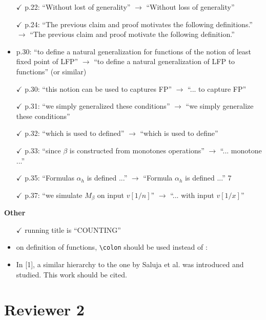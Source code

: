 \documentclass[a4paper]{article}
\begin{document}
\begin{itemize}
	\item[$\checkmark$] p.22: ``Without lost of generality'' $\to$ ``Without loss of generality''
	\item[$\checkmark$] p.24: ``The previous claim and proof motivates the following definitions.'' $\to$ ``The previous
	claim and proof motivate the following definition.''
	\item p.30: ``to define a natural generalization for functions of the notion of least fixed point of
	LFP'' $\to$ ``to define a natural generalization of LFP to functions'' (or similar)
	\item[$\checkmark$] p.30: ``this notion can be used to captures FP'' $\to$ ``... to capture FP''
	\item[$\checkmark$] p.31: ``we simply generalized these conditions'' $\to$ ``we simply generalize these conditions''
	\item[$\checkmark$] p.32: ``which is used to defined'' $\to$ ``which is used to define''
	\item[$\checkmark$] p.33: ``since $\beta$ is constructed from monotones operations'' $\to$ ``... monotone ...''
	\item[$\checkmark$] p.35: ``Formulas $\alpha_h$ is defined ...'' $\to$ ``Formula $\alpha_h$ is defined ...''
	7
	\item[$\checkmark$] p.37: ``we simulate $M_\beta$ on input $v[1/n]$'' $\to$ ``... with input $v[1/x]$''
\end{itemize}
\vspace{1em}
{\bf Other}
\begin{itemize}
	\setlength\itemsep{0.5em}
	\item[$\checkmark$] running title is ``COUNTING''
	\item on definition of functions, \verb|\colon| should be used instead of :
	\item In [1], a similar hierarchy to the one by Saluja et al. was introduced and studied. This work
	should be cited.
\end{itemize}

\bigskip

\section*{Reviewer 2}
\end{document}
